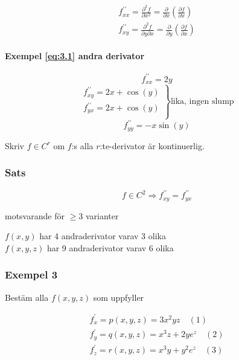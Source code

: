 \documentclass{article}
\begin{document}
\[
\begin{split}
	f_{xx}^{\prime\prime} = \frac{\partial^2f}{\partial x^2} = \frac{\partial}{\partial x} \left(\frac{\partial f}{\partial x}\right) \\
	f_{xy}^{\prime\prime} = \frac{\partial^2f}{\partial y\partial x} = \frac{\partial}{\partial y} \left(\frac{\partial f}{\partial x}\right)
\end{split}
\]

\paragraph{Exempel \eqref{eq:3.1} andra derivator}

\[
	f_{xx}^{\prime\prime} = 2y
\]
\[
\left.\begin{array}{rcl}
	f_{xy}^{\prime\prime} = 2x + \cos(y) \\
	f_{yx}^{\prime\prime} = 2x + \cos(y)\\
\end{array}\right\}\text{lika, ingen slump}
\]
\[
	f_{yy}^{\prime\prime} = -x\sin(y)
\]

Skriv \(f\in C^r\) om \(f\):s alla \(r\):te-derivator är kontinuerlig.

\subsubsection{Sats}

\[
	f \in C^2 \Rightarrow f_{xy}^{\prime\prime} = f_{yx}^{\prime\prime}
\]

motsvarande för \(\geq 3\) varianter \newline

\(f(x,y)\) har 4 andraderivator varav 3 olika \\
\(f(x,y,z)\) har 9 andraderivator varav 6 olika

\newpage

\subsubsection{Exempel 3}

Bestäm alla \(f(x,y,z)\) som uppfyller

\begin{equation}
\begin{split}
	f_{x}^{\prime} = p(x,y,z) = 3x^2yz \quad (1) \\
	f_{y}^{\prime} = q(x,y,z) = x^3z + 2ye^z \quad (2) \\
	f_{z}^{\prime} = r(x,y,z) = x^3y + y^2e^z \quad (3) 
\end{split}
\end{equation}
\end{document}
